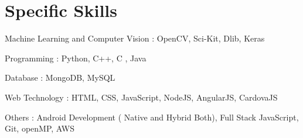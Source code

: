 \section{Specific Skills}

\begin{skill-env}
	\item Machine Learning and Computer Vision :  OpenCV, Sci-Kit, Dlib, Keras

	\item Programming :  Python, C++, C , Java
	
	\item Database :  MongoDB, MySQL
		
	\item Web Technology :  HTML, CSS, JavaScript, NodeJS, AngularJS, CardovaJS
	
	\item Others :  Android Development ( Native and Hybrid Both), Full Stack JavaScript, Git, openMP, AWS
	
\end{skill-env}
\sectionsep